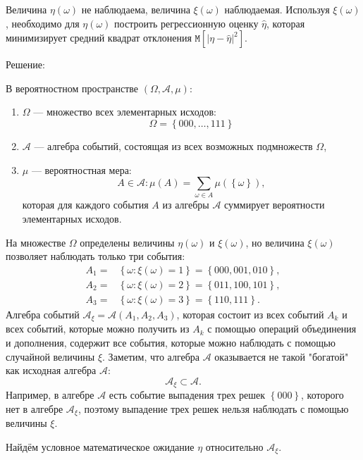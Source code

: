 \documentclass[a4paper,12pt]{article}
\newcommand{\solution}{Решение:\par}
\newcommand{\expectation}[1]{\texttt{M} \left[ #1 \right]}
\newcommand{\modulus}[1]{\left | #1 \right |}
\newcommand{\set}[1]{\left \{ #1 \right \}}
\begin{document}
Величина $\eta(\omega)$ не наблюдаема, величина $\xi(\omega)$ наблюдаемая. Используя $\xi(\omega)$, необходимо для $\eta(\omega)$ построить
регрессионную оценку $\widehat{\eta}$, которая минимизирует средний квадрат отклонения $\expectation{\modulus{\eta - \widehat{\eta}}^2}$.

\solution

В вероятностном пространстве $(\Omega, \mathcal{A}, \mu)$:
\begin{enumerate}
    \item $\Omega$ --- множество всех элементарных исходов:
          \[
              \Omega = \set{000, \dots, 111}
          \]

    \item $\mathcal{A}$ --- алгебра событий, состоящая из всех возможных подмножеств $\Omega$,
    \item $\mu$ --- вероятностная мера:
          \[
              A \in \mathcal{A}: \mu \left(A \right) = \sum_{\omega \in A} \mu \left( \set{\omega} \right) ,
          \]
          которая для каждого события $A$ из алгебры $\mathcal{A}$ суммирует вероятности элементарных исходов.
\end{enumerate}

На множестве $\Omega$ определены величины $\eta(\omega)$ и $\xi(\omega)$, но величина $\xi(\omega)$ позволяет наблюдать только три события:
\begin{align*}
    A_1 = & \set{\omega: \xi(\omega) = 1} = \set{000, 001, 010} , \\
    A_2 = & \set{\omega: \xi(\omega) = 2} = \set{011, 100, 101} , \\
    A_3 = & \set{\omega: \xi(\omega) = 3} = \set{110, 111} .
\end{align*}
Алгебра событий $\mathcal{A}_\xi = \mathcal{A}(A_1, A_2, A_3)$, которая состоит из всех событий $A_k$ и всех событий, которые можно получить из
$A_k$ с помощью операций объединения и дополнения, содержит все события, которые можно наблюдать с помощью случайной величины $\xi$. Заметим, что
алгебра $\mathcal{A}$ оказывается не такой "богатой"{} как исходная алгебра $\mathcal{A}$:
\[
    \mathcal{A}_\xi \subset \mathcal{A}.
\]
Например, в алгебре $\mathcal{A}$ есть событие выпадения трех решек $\set{000}$, которого нет в алгебре $\mathcal{A}_\xi$, поэтому выпадение трех решек
нельзя наблюдать с помощью величины $\xi$.

Найдём условное математическое ожидание $\eta$ относительно $\mathcal{A}_\xi$.
\end{document}
